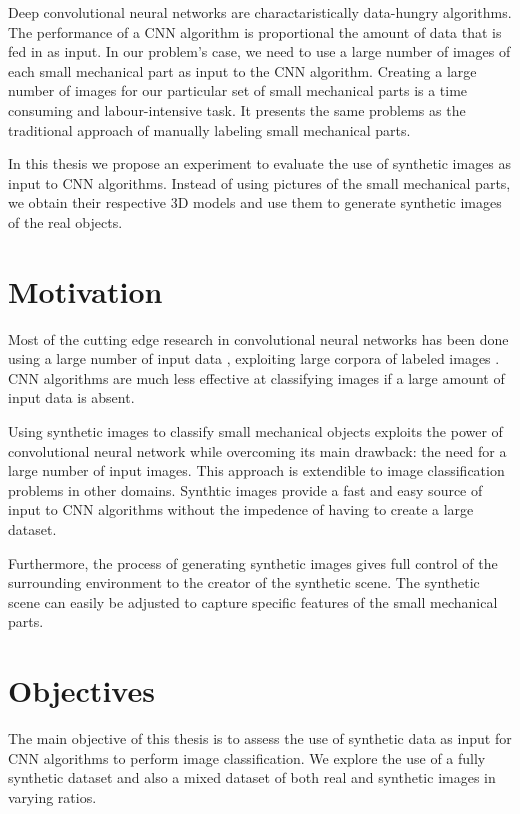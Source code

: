 \documentclass[a4paper,12pt,twoside]{report}
\begin{document}
Deep convolutional neural networks are charactaristically data-hungry algorithms. The performance of a CNN algorithm is proportional the amount of data that is fed in as input. In our problem's case, we need to use a large number of images of each small mechanical part as input to the CNN algorithm. Creating a large number of images for our particular set of small mechanical parts is a time consuming and labour-intensive task. It presents the same problems as the traditional approach of manually labeling small mechanical parts.

In this thesis we propose an experiment to evaluate the use of synthetic images as input to CNN algorithms. Instead of using pictures of the small mechanical parts, we obtain their respective 3D models and use them to generate synthetic images of the real objects.

\section{Motivation}

Most of the cutting edge research in convolutional neural networks has been done using a large number of input data \cite{krizhevsky2012imagenet} \cite{simonyan2014very} \cite{szegedy2015going} \cite{he2016deep}, exploiting large corpora of labeled images \cite{deng2009imagenet}. CNN algorithms are much less effective at classifying images if a large amount of input data is absent.

Using synthetic images to classify small mechanical objects exploits the power of convolutional neural network while overcoming its main drawback: the need for a large number of input images. This approach is extendible to image classification problems in other domains. Synthtic images provide a fast and easy source of input to CNN algorithms without the impedence of having to create a large dataset.

Furthermore, the process of generating synthetic images gives full control of the surrounding environment to the creator of the synthetic scene. The synthetic scene can easily be adjusted to capture specific features of the small mechanical parts.

\section{Objectives}

The main objective of this thesis is to assess the use of synthetic data as input for CNN algorithms to perform image classification. We explore the use of a fully synthetic dataset and also a mixed dataset of both real and synthetic images in varying ratios.
\end{document}
